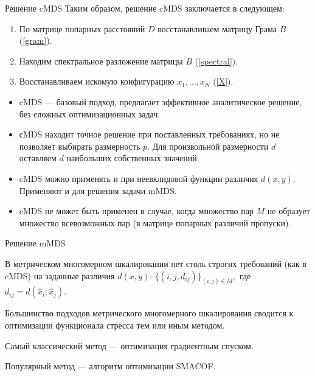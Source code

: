 \documentclass[9pt]{beamer}
\begin{document}
\begin{frame}{Решение cMDS}
    Таким образом, решение cMDS заключается в следующем:
\begin{enumerate}
    \item По матрице попарных расстояний $D$ восстанавливаем матрицу Грама $B$ (\ref{gram}).
    \item Находим спектральное разложение матрицы $B$ (\ref{spectral}).
    \item Восстанавливаем искомую конфигурацию $x_1,...,x_N$ (\ref{X}).
\end{enumerate}

\begin{itemize}

\item cMDS --- базовый подход, предлагает эффективное аналитическое решение, без сложных оптимизационных задач.

\item сMDS находит точное решение при поставленных требованиях, но не позволяет выбирать размерность $p$. Для произвольной размерности $d$ оставляем $d$ наибольших собственных значений.

\item cMDS можно применять и при неевклидовой функции различия $d(x,y)$. Применяют и для решения задачи mMDS.

\item cMDS не может быть применен в случае, когда множество пар $M$ не образует множество всевозможных пар (в матрице попарных различий пропуски).
    
\end{itemize}
\end{frame}

\begin{frame}{Решение mMDS}

В метрическом многомерном шкалировании нет столь строгих требований (как в cMDS) на заданные различия $d(x, y)$: $\{(i, j, d_{ij})\}_{(i, j) \in M},$ где $d_{ij} = d(\hat{x}_i, \hat{x}_j)$.

\vspace{\baselineskip}  

Большинство подходов метрического многомерного шкалирования сводится к оптимизации функционала стресса тем или иным методом.

\vspace{\baselineskip}  

Самый классический метод --- оптимизация градиентным спуском.

\vspace{\baselineskip}  
Популярный метод --- алгоритм оптимизации SMACOF. 
    
\end{frame}
\end{document}
